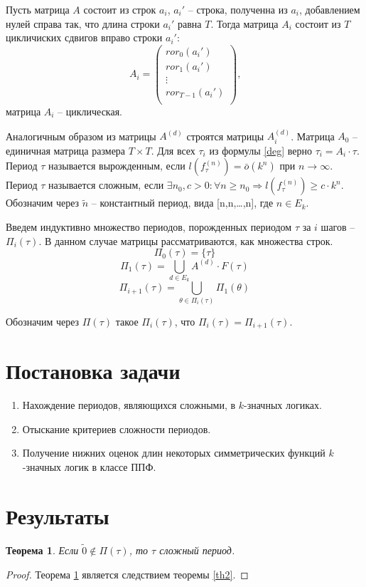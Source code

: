 \documentclass[bibliography=totoc, a4paper, 14pt]{extarticle}
\let\stdsection\section
\renewcommand\section{\newpage\stdsection}
\newtheorem{myth}{Теорема}
\begin{document}
Пусть матрица $A$ состоит из строк $a_i$, $a_i'$ -- строка, полученна из $a_i$, добавлением нулей справа так, что
длина строки $a_i'$ равна $T$. Тогда матрица $A_i$ состоит из $T$ цикличиских сдвигов вправо строки $a_i'$:
$$A_i = \begin{pmatrix}
ror_0(a_i')     \\
ror_1(a_i')     \\
\vdots          \\
ror_{T-1}(a_i') \\
\end{pmatrix}
\text{,}
$$
матрица $A_i$ -- циклическая.

Аналогичным образом из матрицы $A^{(d)}$ строятся матрицы $A_i^{(d)}$.
Матрица $A_0$ -- единичная матрица размера $T \times T$.
Для всех $\tau_i$ из формулы \eqref{deg} верно $\tau_i = A_i \cdot \tau$.
Период $\tau$ называется вырожденным, если $l(f_{\tau}^{(n)}) = \bar{o}(k^n)$ при $n\rightarrow\infty$.
Период $\tau$ называется сложным, если
$\exists n_0, c > 0 : \forall n \geqslant n_0 \Rightarrow l(f_{\tau}^{(n)}) \geqslant c \cdot k^n$.
Обозначим через $\tilde{n}$ -- константный период, вида [n,n,\ldots,n], где $n \in E_k$.

Введем индуктивно множество периодов, порожденных периодом $\tau$ за $i$ шагов -- $\Pi_i(\tau)$.
В данном случае матрицы рассматриваются, как множества строк.
$$\Pi_0(\tau) = \{\tau\}$$
$$\Pi_1(\tau) = \underset{d \in E_k}{\bigcup} A^{(d)} \cdot F(\tau)$$
$$\Pi_{i+1}(\tau) = \underset{\theta \in \Pi_i(\tau)}{\bigcup} \Pi_1(\theta)$$

Обозначим через $\Pi(\tau)$ такое $\Pi_i(\tau)$, что $\Pi_i(\tau) = \Pi_{i+1}(\tau)$.

\section{Постановка задачи}
\begin{enumerate}
\item Нахождение периодов, являющихся сложными, в $k$-значных логиках.

\item Отыскание критериев сложности периодов.

\item Получение нижних оценок длин некоторых симметрических функций $k$-значных логик в классе ППФ.
\end{enumerate}

\section{Результаты}
\begin{myth}
\label{th1}
Если $\tilde{0} \not\in \Pi(\tau)$, то $\tau$ сложный период.
\end{myth}
\begin{proof}
Теорема \ref{th1} является следствием теоремы \ref{th2}.
\end{proof}
\end{document}
